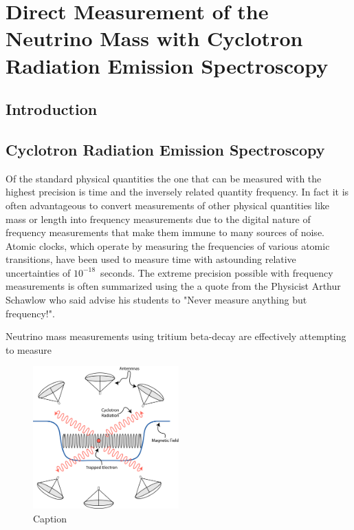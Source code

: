 
\chapter{Direct Measurement of the Neutrino Mass with Cyclotron Radiation Emission Spectroscopy}

\section{Introduction}

\section{Cyclotron Radiation Emission Spectroscopy}

Of the standard physical quantities the one that can be measured with the highest precision is time and the inversely related quantity frequency. In fact it is often advantageous to convert measurements of other physical quantities like mass or length into frequency measurements due to the digital nature of frequency measurements that make them immune to many sources of noise. Atomic clocks, which operate by measuring the frequencies of various atomic transitions, have been used to measure time with astounding relative uncertainties of $10^{-18}$~seconds. The extreme precision possible with frequency measurements is often summarized using the a quote from the Physicist Arthur Schawlow who said advise his students to "Never measure anything but frequency!". 

Neutrino mass measurements using tritium beta-decay are effectively attempting to measure  

\begin{figure}[htbp]
    \centering
    \includegraphics[width=0.5\textwidth]{figs/Chapter-3/230303_cres_cartoon.png}
    \caption{Caption}
    \label{fig:cres_cartoon}
\end{figure}

